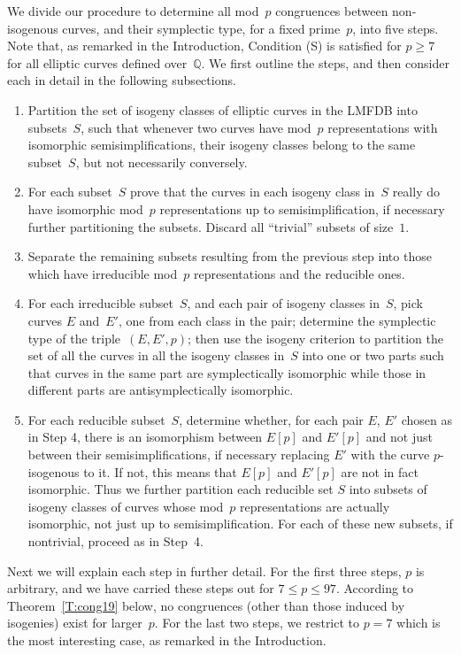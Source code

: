 \documentclass[12pt, reqno]{amsart}
\newcommand{\Q}{\mathbb{Q}}
\numberwithin{equation}{section}
\theoremstyle{definition}
\theoremstyle{remark}
\begin{document}
We divide our procedure to determine all mod~$p$ congruences between
non-isogenous curves, and their symplectic type, for a fixed
prime~$p$, into five steps.  Note that, as remarked in the
Introduction, Condition (S) is satisfied for $p\ge7$ for all elliptic
curves defined over~$\Q$.  We first outline the steps, and then
consider each in detail in the following subsections.
\begin{enumerate}[1.]
\item Partition the set of isogeny classes of elliptic curves in the LMFDB
  into subsets~$S$, such that whenever two curves have mod~$p$
  representations with isomorphic semisimplifications, their isogeny
  classes belong to the same subset~$S$, but not necessarily
  conversely.
\item For each subset~$S$ prove that the curves in each isogeny class in~$S$ really
  do have isomorphic mod~$p$ representations up to
  semisimplification, if necessary further partitioning the subsets.
  Discard all ``trivial'' subsets of size~$1$.
\item Separate the remaining subsets resulting from the previous
  step into those which have irreducible mod~$p$ representations and
  the reducible ones.
\item For each irreducible subset~$S$, and each pair of isogeny
  classes in~$S$, pick curves $E$ and~$E'$, one from each class in the
  pair; determine the symplectic type of the triple~$(E,E',p)$; then
  use the isogeny criterion to partition the set of all the curves in
  all the isogeny classes in~$S$ into one or two parts such that curves
  in the same part are symplectically isomorphic while those in
  different parts are antisymplectically isomorphic.
\item For each reducible subset~$S$, determine whether, for each pair
  $E$, $E'$ chosen as in Step 4, there is an isomorphism between
  $E[p]$ and $E'[p]$ and not just between their semisimplifications,
  if necessary replacing $E'$ with the curve $p$-isogenous to it.  If
  not, this means that $E[p]$ and $E'[p]$ are not in fact isomorphic.
  Thus we further partition each reducible set $S$ into subsets of
  isogeny classes of curves whose mod~$p$ representations are actually
  isomorphic, not just up to semisimplification.  For each of these
  new subsets, if nontrivial, proceed as in Step~4.

\end{enumerate}
Next we will explain each step in further detail.  For the first three
steps, $p$ is arbitrary, and we have carried these steps out for $7\le
p\le97$.  According to Theorem~\ref{T:cong19} below, no congruences
(other than those induced by isogenies) exist for larger~$p$.  For the
last two steps, we restrict to $p=7$ which is the most interesting
case, as remarked in the Introduction.
\end{document}
